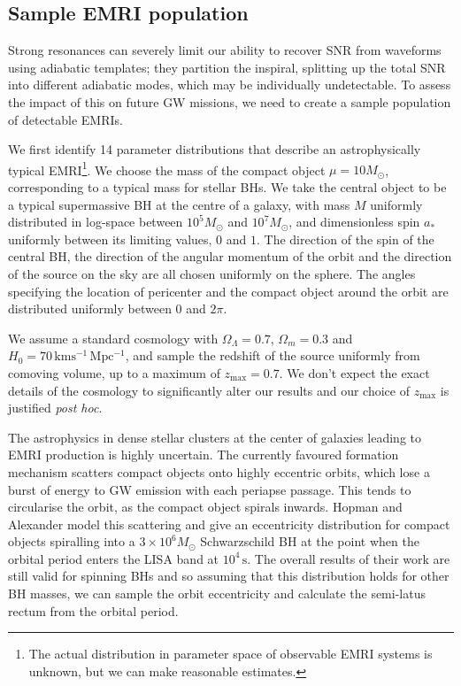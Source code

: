 \documentclass[aps,prd,amsfonts,amssymb,amsmath,nofootinbib,reprint,showpacs,superscriptaddress,twocolumn]{revtex4}
\begin{document}
\subsection{Sample EMRI population}

Strong resonances can severely limit our ability to recover SNR from waveforms using adiabatic templates; they partition the inspiral, splitting up the total SNR into different adiabatic modes, which may be individually undetectable. To assess the impact of this on future GW missions, we need to create a sample population of detectable EMRIs.

We first identify 14 parameter distributions that describe an astrophysically typical EMRI\footnote{The actual distribution in parameter space of observable EMRI systems is unknown, but we can make reasonable estimates.}. We choose the mass of the compact object $\mu = 10 M_\odot$, corresponding to a typical mass for stellar BHs. We take the central object to be a typical supermassive BH at the centre of a galaxy, with mass $M$ uniformly distributed in log-space between $10^5 M_\odot$ and $10^7 M_\odot$, and dimensionless spin $a_\ast$ uniformly between its limiting values, $0$ and $1$. The direction of the spin of the central BH, the direction of the angular momentum of the orbit and the direction of the source on the sky are all chosen uniformly on the sphere. The angles specifying the location of pericenter and the compact object around the orbit are distributed uniformly between $0$ and $2\pi$.

We assume a standard cosmology with $\Omega_\Lambda = 0.7$, $\Omega_m = 0.3$ and $H_0 = 70\,\mathrm{km s^{-1}\, Mpc^{-1}}$, and sample the redshift of the source uniformly from comoving volume, up to a maximum of $z_\mathrm{max} = 0.7$. We don't expect the exact details of the cosmology to significantly alter our results and our choice of $z_\mathrm{max}$ is justified \textit{post hoc}.

The astrophysics in dense stellar clusters at the center of galaxies leading to EMRI production is highly uncertain. The currently favoured formation mechanism scatters compact objects onto highly eccentric orbits, which lose a burst of energy to GW emission with each periapse passage. This tends to circularise the orbit, as the compact object spirals inwards. Hopman and Alexander \cite{Hopman2005} model this scattering and give an eccentricity distribution for compact objects spiralling into a $3 \times 10^6 M_\odot$ Schwarzschild BH at the point when the orbital period enters the LISA band at $10^4\,\mathrm{s}$. The overall results of their work are still valid for spinning BHs and so assuming that this distribution holds for other BH masses, we can sample the orbit eccentricity and calculate the semi-latus rectum from the orbital period.
\end{document}
